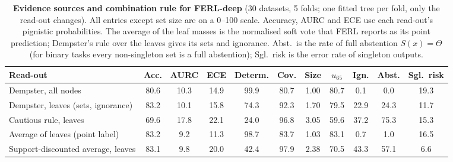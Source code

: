 \begin{table}[t]
\centering
\footnotesize
\setlength{\tabcolsep}{2.5pt}
\caption{\textbf{Evidence sources and combination rule for FERL-deep} (30 datasets, 5 folds; one fitted tree per fold, only the read-out changes). All entries except set size are on a 0--100 scale. Accuracy, AURC and ECE use each read-out's pignistic probabilities. The average of the leaf masses is the normalised soft vote that FERL reports as its point prediction; Dempster's rule over the leaves gives its sets and ignorance. Abst.\ is the rate of full abstention $S(x)=\Theta$ (for binary tasks every non-singleton set is a full abstention); Sgl.\ risk is the error rate of singleton outputs.}
\label{tab:decision-rule-ablation}
\begin{tabular}{@{}lcccccccccc@{}}
\toprule
Read-out & Acc. & AURC & ECE & Determ. & Cov. & Size & $u_{65}$ & Ign. & Abst. & Sgl.\ risk\\
\midrule
Dempster, all nodes & 80.6 & 10.3 & 14.9 & 99.9 & 80.7 & 1.00 & 80.7 & 0.1 & 0.0 & 19.3\\
Dempster, leaves (sets, ignorance) & 83.2 & 10.1 & 15.8 & 74.3 & 92.3 & 1.70 & 79.5 & 22.9 & 24.3 & 11.7\\
Cautious rule, leaves & 69.6 & 17.8 & 22.1 & 24.0 & 96.8 & 3.05 & 59.6 & 37.2 & 75.3 & 15.3\\
Average of leaves (point label) & 83.2 & 9.2 & 11.3 & 98.7 & 83.7 & 1.03 & 83.1 & 0.7 & 1.0 & 16.5\\
Support-discounted average, leaves & 83.1 & 9.8 & 20.0 & 42.4 & 97.9 & 2.38 & 70.5 & 43.3 & 57.1 & 6.6\\
\bottomrule
\end{tabular}
\end{table}

